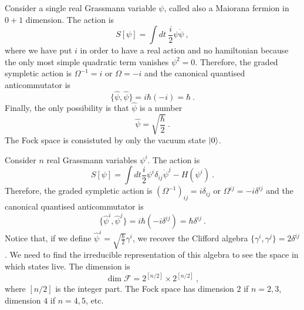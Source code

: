     \begin{example}
        Consider a single real Grassmann variable $\psi$, called also a Maiorana fermion in $0 + 1$ dimension. The action is 
        \begin{equation*}
            S[\psi] = \int dt ~ \frac{i}{2} \psi \dot \psi ~,
        \end{equation*}
        where we have put $i$ in order to have a real action and no hamiltonian because the only most simple quadratic term vanishes $\psi^2 = 0$. Therefore, the graded sympletic action is $\Omega^{-1} = i$ or $\Omega = -i$ and the canonical quantised anticommutator is 
        \begin{equation*}
            \{\hat \psi, \hat \psi\} = i \hbar (-i) = \hbar ~.
        \end{equation*}
        Finally, the only possibility is that $\hat \psi$ is a number
        \begin{equation*}
            \hat \psi = \sqrt{\frac{\hbar}{2}} ~.
        \end{equation*}
        The Fock space is consistuted by only the vacuum state $\vert0\rangle$. 
    \end{example}

    \begin{example}
        Consider $n$ real Grassmann variables $\psi^i$. The action is 
        \begin{equation*}
            S[\psi] = \int dt \frac{i}{2} \psi^i \delta_{ij} \dot \psi^j - H(\psi^i) ~.
        \end{equation*}
        Therefore, the graded sympletic action is $(\Omega^{-1})_{ij} = i \delta_{ij}$ or $\Omega^{ij} = -i \delta^{ij}$ and the canonical quantised anticommutator is 
        \begin{equation*}
            \{\hat \psi^i, \hat \psi^j\} = i \hbar (-i \delta^{ij}) = \hbar \delta^{ij} ~.
        \end{equation*}
        Notice that, if we define $\hat \psi^i = \sqrt{\frac{\hbar}{2}} \gamma^i$, we recover the Clifford algebra $\{\gamma^i, \gamma^j\} = 2 \delta^{ij}$. We need to find the irreducible representation of this algebra to see the space in which states live. The dimension is
        \begin{equation*}
            \dim \mathcal F = 2^{[n/2]} \times 2^{[n/2]} ~,
        \end{equation*}
        where $[n/2]$ is the integer part. The Fock space has dimension $2$ if $n=2,3$, dimension $4$ if $n = 4,5$, etc.
    \end{example}


